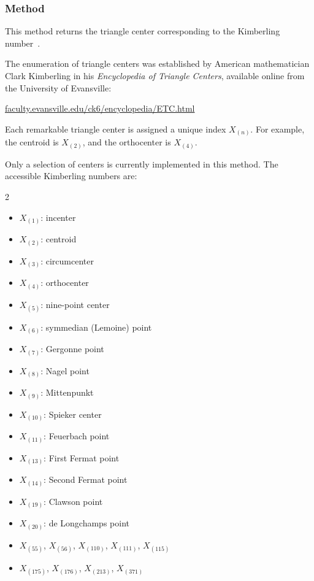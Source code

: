 \subsubsection{Method }
\label{ssub:method_triangle_kimberling_n}

This method returns the triangle center corresponding to the Kimberling number~.

\medskip

The enumeration of triangle centers was established by American mathematician Clark Kimberling in his \textit{Encyclopedia of Triangle Centers}, available online from the University of Evansville:
\begin{center}
\href{http://faculty.evansville.edu/ck6/encyclopedia/ETC.html}{faculty.evansville.edu/ck6/encyclopedia/ETC.html}
\end{center}


Each remarkable triangle center is assigned a unique index $X_{(n)}$. For example, the centroid is $X_{(2)}$, and the orthocenter is $X_{(4)}$.

\medskip

Only a selection of centers is currently implemented in this method. The accessible Kimberling numbers are:
\begin{multicols}{2}
\begin{itemize}
  \item $X_{(1)}$: incenter
  \item $X_{(2)}$: centroid
  \item $X_{(3)}$: circumcenter
  \item $X_{(4)}$: orthocenter
  \item $X_{(5)}$: nine-point center
  \item $X_{(6)}$: symmedian (Lemoine) point
  \item $X_{(7)}$: Gergonne point
  \item $X_{(8)}$: Nagel point
  \item $X_{(9)}$: Mittenpunkt
  \item $X_{(10)}$: Spieker center
  \item $X_{(11)}$: Feuerbach point
  \item $X_{(13)}$: First Fermat point
  \item $X_{(14)}$: Second Fermat point
  \item $X_{(19)}$: Clawson point
  \item $X_{(20)}$: de Longchamps point
  \item $X_{(55)}$, $X_{(56)}$, $X_{(110)}$, $X_{(111)}$, $X_{(115)}$
  \item $X_{(175)}$, $X_{(176)}$, $X_{(213)}$, $X_{(371)}$
\end{itemize}
\end{multicols}


